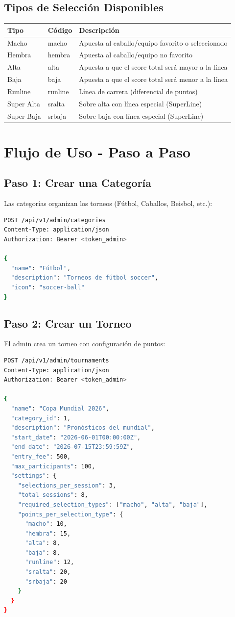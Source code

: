 \documentclass[12pt,a4paper]{article}
\begin{document}
\subsection{Tipos de Selección Disponibles}
\begin{tabular}{|l|l|p{6cm}|}
\hline
\textbf{Tipo} & Código & Descripción \\
\hline
Macho & macho & Apuesta al caballo/equipo favorito o seleccionado \\
Hembra & hembra & Apuesta al caballo/equipo no favorito \\
Alta & alta & Apuesta a que el score total será mayor a la línea \\
Baja & baja & Apuesta a que el score total será menor a la línea \\
Runline & runline & Línea de carrera (diferencial de puntos) \\
Super Alta & sralta & Sobre alta con línea especial (SuperLine) \\
Super Baja & srbaja & Sobre baja con línea especial (SuperLine) \\
\hline
\end{tabular}

\newpage

\section{Flujo de Uso - Paso a Paso}

\subsection{Paso 1: Crear una Categoría}
Las categorías organizan los torneos (Fútbol, Caballos, Beisbol, etc.):

\begin{lstlisting}[language=bash]
POST /api/v1/admin/categories
Content-Type: application/json
Authorization: Bearer <token_admin>

{
  "name": "Fútbol",
  "description": "Torneos de fútbol soccer",
  "icon": "soccer-ball"
}
\end{lstlisting}

\subsection{Paso 2: Crear un Torneo}
El admin crea un torneo con configuración de puntos:

\begin{lstlisting}[language=bash]
POST /api/v1/admin/tournaments
Content-Type: application/json
Authorization: Bearer <token_admin>

{
  "name": "Copa Mundial 2026",
  "category_id": 1,
  "description": "Pronósticos del mundial",
  "start_date": "2026-06-01T00:00:00Z",
  "end_date": "2026-07-15T23:59:59Z",
  "entry_fee": 500,
  "max_participants": 100,
  "settings": {
    "selections_per_session": 3,
    "total_sessions": 8,
    "required_selection_types": ["macho", "alta", "baja"],
    "points_per_selection_type": {
      "macho": 10,
      "hembra": 15,
      "alta": 8,
      "baja": 8,
      "runline": 12,
      "sralta": 20,
      "srbaja": 20
    }
  }
}
\end{lstlisting}
\end{document}
